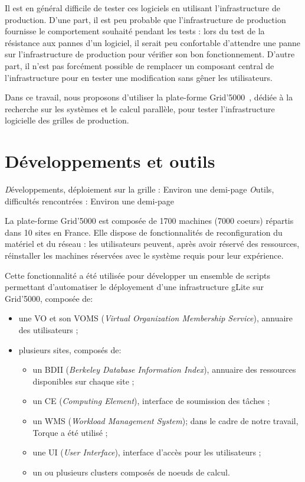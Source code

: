\documentclass[a4paper,11pt]{article}
\newcommand{\todo}[1]{{\color{red}\textsl #1}}
\begin{document}
Il est en général difficile de tester ces logiciels en utilisant
l'infrastructure de production. D'une part, il est peu probable que
l'infrastructure de production fournisse le comportement souhaité pendant les
tests : lors du test de la résistance aux pannes d'un logiciel, il serait peu
confortable d'attendre une panne sur l'infrastructure de production pour
vérifier son bon fonctionnement. D'autre part, il n'est pas forcément possible
de remplacer un composant central de l'infrastructure pour en tester une
modification sans gêner les utilisateurs.

Dans ce travail, nous proposons d'utiliser la plate-forme
Grid'5000~\cite{grid5000,grid5000web}, dédiée à la recherche sur les systèmes
et le calcul parallèle, pour tester l'infrastructure logicielle des grilles de
production.

\section{Développements et outils}
\todo{Développements, déploiement sur la grille : Environ une demi-page}
\todo{Outils, difficultés rencontrées : Environ une demi-page}

La plate-forme Grid'5000 est composée de 1700 machines (7000 coeurs) répartis
dans 10 sites en France. Elle dispose de fonctionnalités de reconfiguration du
matériel et du réseau : les utilisateurs peuvent, après avoir réservé des
ressources, réinstaller les machines réservées avec le système requis pour leur
expérience.

Cette fonctionnalité a été utilisée pour développer un ensemble de scripts
permettant d'automatiser le déployement d'une infrastructure gLite sur
Grid'5000, composée de:

\begin{itemize}

\item une VO et son VOMS (\textsl{Virtual Organization Membership Service}),
	annuaire des utilisateurs ;

\item plusieurs sites, composés de:

\begin{itemize}

	\item un BDII (\textsl{Berkeley Database Information Index}), annuaire
		des ressources disponibles sur chaque site ;

	\item un CE (\textsl{Computing Element}), interface de soumission des
		tâches ;

	\item un WMS (\textsl{Workload Management System}); dans le cadre de
		notre travail, Torque a été utilisé ;

	\item une UI (\textsl{User Interface}), interface d'accès pour les
		utilisateurs ;

	\item un ou plusieurs clusters composés de noeuds de calcul.

\end{itemize}
\end{itemize}
\end{document}
